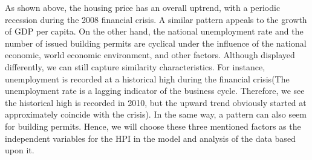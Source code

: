 \documentclass[11pt]{article}
\begin{document}
\begin{figure}[H]
\captionsetup[subfigure]{labelformat=empty}
\centering
{}
\end{figure}

As shown above, the housing price has an overall uptrend, with a periodic recession during the 2008 financial crisis. A similar pattern appeals to the growth of GDP per capita. On the other hand, the national unemployment rate and the number of issued building permits are cyclical under the influence of the national economic, world economic environment, and other factors. Although displayed differently, we can still capture similarity characteristics. For instance, unemployment is recorded at a historical high during the financial crisis(The unemployment rate is a lagging indicator of the business cycle. Therefore, we see the historical high is recorded in 2010, but the upward trend obviously started at approximately coincide with the crisis). In the same way, a pattern can also seem for building permits. 
Hence, we will choose these three mentioned factors as the independent variables for the HPI in the model and analysis of the data based upon it.   


\end{document}
